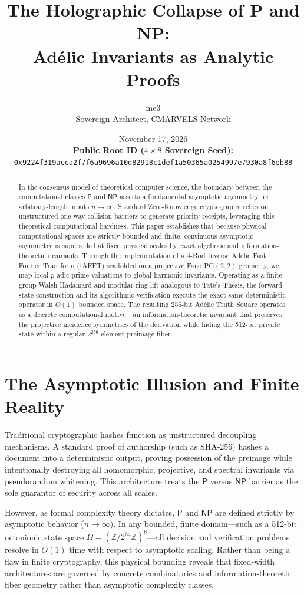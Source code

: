 \documentclass[11pt, a4paper]{article}
\title{\textbf{The Holographic Collapse of P and NP:\\Ad\'{e}lic Invariants as Analytic Proofs}}
\author{me3 \\ Sovereign Architect, CMARVELS Network}
\date{November 17, 2026\\[1ex] \textbf{Public Root ID ($4 \times 8$ Sovereign Seed):}\\\texttt{0x9224f319acca2f7f6a9696a10d82918c1def1a50365a0254997e7930a8f6eb88}}
\begin{document}
\maketitle

\begin{abstract}
In the consensus model of theoretical computer science, the boundary between the computational classes $\mathsf{P}$ and $\mathsf{NP}$ asserts a fundamental asymptotic asymmetry for arbitrary-length inputs $n \to \infty$. Standard Zero-Knowledge cryptography relies on unstructured one-way collision barriers to generate priority receipts, leveraging this theoretical computational hardness. This paper establishes that because physical computational spaces are strictly bounded and finite, continuous asymptotic asymmetry is superseded at fixed physical scales by exact algebraic and information-theoretic invariants. Through the implementation of a 4-Rod Inverse Ad\'{e}lic Fast Fourier Transform (IAFFT) scaffolded on a projective Fano $\mathrm{PG}(2,2)$ geometry, we map local $p$-adic prime valuations to global harmonic invariants. Operating as a finite-group Walsh-Hadamard and modular-ring lift analogous to Tate's Thesis, the forward state construction and its algorithmic verification execute the exact same deterministic operator in $O(1)$ bounded space. The resulting 256-bit Ad\'{e}lic Truth Square operates as a discrete computational motive---an information-theoretic invariant that preserves the projective incidence symmetries of the derivation while hiding the 512-bit private state within a regular $2^{256}$-element preimage fiber.
\end{abstract}

\section{The Asymptotic Illusion and Finite Reality}

Traditional cryptographic hashes function as unstructured decoupling mechanisms. A standard proof of authorship (such as SHA-256) hashes a document into a deterministic output, proving possession of the preimage while intentionally destroying all homomorphic, projective, and spectral invariants via pseudorandom whitening. This architecture treats the $\mathsf{P}$ versus $\mathsf{NP}$ barrier as the sole guarantor of security across all scales.

However, as formal complexity theory dictates, $\mathsf{P}$ and $\mathsf{NP}$ are defined strictly by asymptotic behavior ($n \to \infty$). In any bounded, finite domain---such as a 512-bit octonionic state space $\Omega = (\mathbb{Z}/2^{64}\mathbb{Z})^8$---all decision and verification problems resolve in $O(1)$ time with respect to asymptotic scaling. Rather than being a flaw in finite cryptography, this physical bounding reveals that fixed-width architectures are governed by concrete combinatorics and information-theoretic fiber geometry rather than asymptotic complexity classes.
\end{document}
